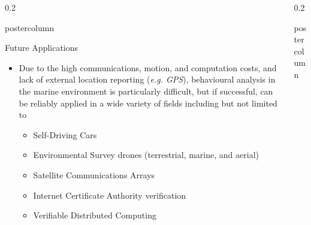 \documentclass[final,hyperref={pdfpagelabels=false}]{beamer}
\def\colwidth{0.2\linewidth}
\begin{document}
\begin{frame}[fragile]
\begin{columns}[T]
\begin{column}{\colwidth}
\begin{beamercolorbox}[center,wd=\textwidth]{postercolumn}
\begin{minipage}[T]{.98\textwidth}
{          %
            \begin{block}{Future Applications}
              \begin{itemize}
                \item Due to the high communications, motion, and computation costs, and lack of external location reporting (\emph{e.g. GPS}), 
                  behavioural analysis in the marine environment is particularly difficult, but if successful, can be reliably applied in a wide 
                  variety of fields including but not limited to
                \begin{itemize}
                  \item Self-Driving Cars
                  \item Environmental Survey drones (terrestrial, marine, and aerial)
                  \item Satellite Communications Arrays
                  \item Internet Certificate Authority verification
                  \item Verifiable Distributed Computing
                \end{itemize}
              \end{itemize}              
            \end{block}

          }
        \end{minipage}
      \end{beamercolorbox}
    \end{column}
    \begin{column}{\colwidth}
      \begin{beamercolorbox}[center,wd=\textwidth]{postercolumn}
        \begin{minipage}[T]{.98\textwidth} %
          \parbox[t]{\textwidth}{ %

}
\end{minipage}
\end{beamercolorbox}
\end{column}
\end{columns}
\end{frame}
\end{document}
